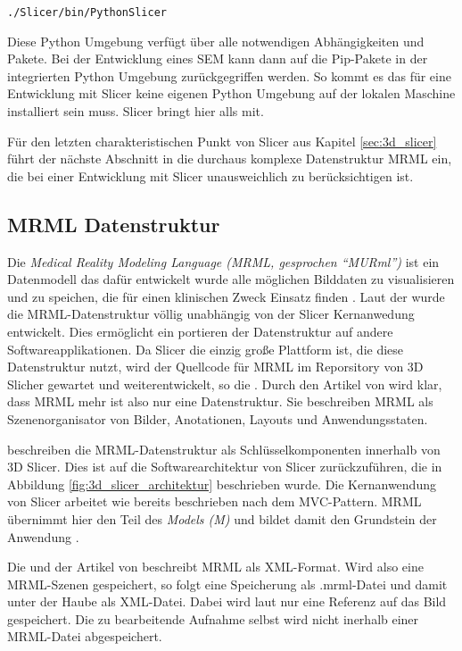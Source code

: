 \texttt{./Slicer/bin/PythonSlicer}

Diese Python Umgebung verfügt über alle notwendigen Abhängigkeiten und Pakete. Bei
der Entwicklung eines SEM kann dann auf die Pip-Pakete in der integrierten Python
Umgebung zurückgegriffen werden. So kommt es das für eine Entwicklung mit Slicer
keine eigenen Python Umgebung auf der lokalen Maschine installiert sein muss. Slicer
bringt hier alls mit.

Für den letzten charakteristischen Punkt von Slicer aus Kapitel \ref{sec:3d_slicer}
führt der nächste Abschnitt in die durchaus komplexe Datenstruktur MRML ein, die
bei einer Entwicklung mit Slicer unausweichlich zu berücksichtigen ist.

\subsection{MRML Datenstruktur}
\label{subsec:mrml_datenstruktur} Die \textit{Medical Reality Modeling Language
(MRML, gesprochen “MURml”)} ist ein Datenmodell das dafür entwickelt wurde alle möglichen
Bilddaten zu visualisieren und zu speichen, die für einen klinischen Zweck
Einsatz finden \citep[vgl.][]{slicer2024}. Laut der \citet{slicer2024} wurde die
MRML-Datenstruktur völlig unabhängig von der Slicer Kernanwedung entwickelt.
Dies ermöglicht ein portieren der Datenstruktur auf andere Softwareapplikationen.
Da Slicer die einzig große Plattform ist, die diese Datenstruktur nutzt, wird der
Quellcode für MRML im Reporsitory von 3D Slicher gewartet und weiterentwickelt,
so die \citet{slicer2024}. Durch den Artikel von \citet[Seite 1327]{fedorov2012slicer}
wird klar, dass MRML mehr ist also nur eine Datenstruktur. Sie beschreiben MRML
als Szenenorganisator von Bilder, Anotationen, Layouts und Anwendungsstaten.

\citet[Seite 1331]{fedorov2012slicer} beschreiben die MRML-Datenstruktur als
Schlüsselkomponenten innerhalb von 3D Slicer. Dies ist auf die Softwarearchitektur
von Slicer zurückzuführen, die in Abbildung \ref{fig:3d_slicer_architektur}
beschrieben wurde. Die Kernanwendung von Slicer arbeitet wie bereits beschrieben
nach dem MVC-Pattern. MRML übernimmt hier den Teil des \textit{Models (M)} und bildet
damit den Grundstein der Anwendung \citep[vgl.][Seite 1332]{fedorov2012slicer}.

Die \citet{slicer2024} und der Artikel von \citet[Seite 1327]{fedorov2012slicer}
beschreibt MRML als XML-Format. Wird also eine MRML-Szenen gespeichert, so folgt
eine Speicherung als .mrml-Datei und damit unter der Haube als XML-Datei. Dabei
wird laut \citet{slicer2024} nur eine Referenz auf das Bild gespeichert. Die zu
bearbeitende Aufnahme selbst wird nicht inerhalb einer MRML-Datei abgespeichert.

